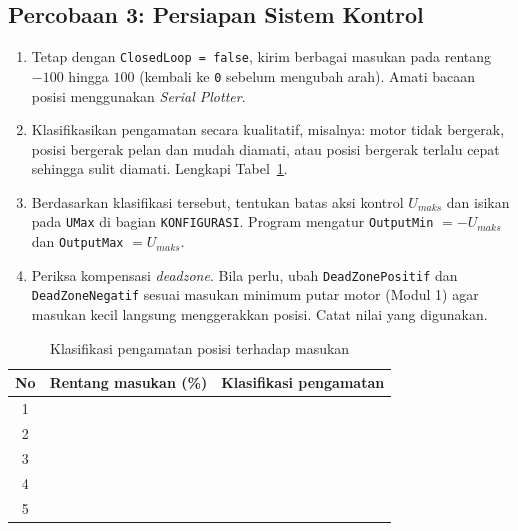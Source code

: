 \documentclass[11pt,a4paper]{article}
\begin{document}
\subsection{Percobaan 3: Persiapan Sistem Kontrol}
\begin{enumerate}
\item Tetap dengan \texttt{ClosedLoop = false}, kirim berbagai masukan pada rentang $-100$ hingga $100$ (kembali ke \texttt{0} sebelum mengubah arah). Amati bacaan posisi menggunakan \textit{Serial Plotter}.
\item Klasifikasikan pengamatan secara kualitatif, misalnya: motor tidak bergerak, posisi bergerak pelan dan mudah diamati, atau posisi bergerak terlalu cepat sehingga sulit diamati. Lengkapi Tabel~\ref{tab:p3_klasifikasi}.
\item Berdasarkan klasifikasi tersebut, tentukan batas aksi kontrol $U_{maks}$ dan isikan pada \texttt{UMax} di bagian \texttt{KONFIGURASI}. Program mengatur \texttt{OutputMin} $= -U_{maks}$ dan \texttt{OutputMax} $= U_{maks}$.
\item Periksa kompensasi \textit{deadzone}. Bila perlu, ubah \texttt{DeadZonePositif} dan \texttt{DeadZoneNegatif} sesuai masukan minimum putar motor (Modul 1) agar masukan kecil langsung menggerakkan posisi. Catat nilai yang digunakan.
\end{enumerate}

\begin{table}[H]
\centering
\caption{Klasifikasi pengamatan posisi terhadap masukan}
\label{tab:p3_klasifikasi}
\begin{tabularx}{\textwidth}{|c|c|X|}
\hline
\textbf{No} & \textbf{Rentang masukan (\%)} & \textbf{Klasifikasi pengamatan} \\
\hline
1 & & \\
2 & & \\
3 & & \\
4 & & \\
5 & & \\
\hline
\end{tabularx}
\end{table}
\end{document}
